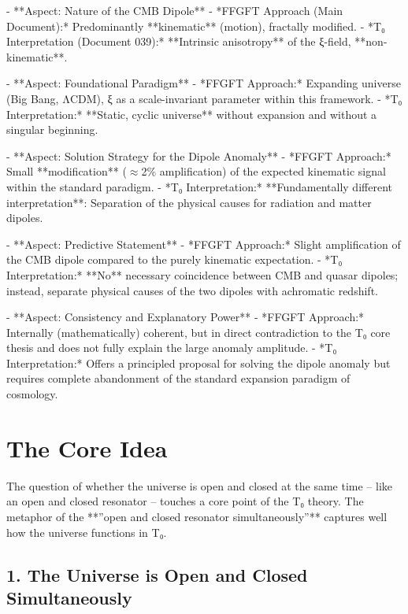 	- **Aspect: Nature of the CMB Dipole**
	- *FFGFT Approach (Main Document):* Predominantly **kinematic** (motion), fractally modified.
	- *T₀ Interpretation (Document 039):* **Intrinsic anisotropy** of the ξ-field, **non-kinematic**.
	
	- **Aspect: Foundational Paradigm**
	- *FFGFT Approach:* Expanding universe (Big Bang, ΛCDM), ξ as a scale-invariant parameter within this framework.
	- *T₀ Interpretation:* **Static, cyclic universe** without expansion and without a singular beginning.
	
	- **Aspect: Solution Strategy for the Dipole Anomaly**
	- *FFGFT Approach:* Small **modification** ($\approx$2\% amplification) of the expected kinematic signal within the standard paradigm.
	- *T₀ Interpretation:* **Fundamentally different interpretation**: Separation of the physical causes for radiation and matter dipoles.
	
	- **Aspect: Predictive Statement**
	- *FFGFT Approach:* Slight amplification of the CMB dipole compared to the purely kinematic expectation.
	- *T₀ Interpretation:* **No** necessary coincidence between CMB and quasar dipoles; instead, separate physical causes of the two dipoles with achromatic redshift.
	
	- **Aspect: Consistency and Explanatory Power**
	- *FFGFT Approach:* Internally (mathematically) coherent, but in direct contradiction to the T₀ core thesis and does not fully explain the large anomaly amplitude.
	- *T₀ Interpretation:* Offers a principled proposal for solving the dipole anomaly but requires complete abandonment of the standard expansion paradigm of cosmology.
	
	\section*{The Core Idea}
	
	The question of whether the universe is open and closed at the same time – like an open and closed resonator – touches a core point of the T₀ theory. The metaphor of the **''open and closed resonator simultaneously''** captures well how the universe functions in T₀.
	
	\subsection*{1. The Universe is Open and Closed Simultaneously}
	
